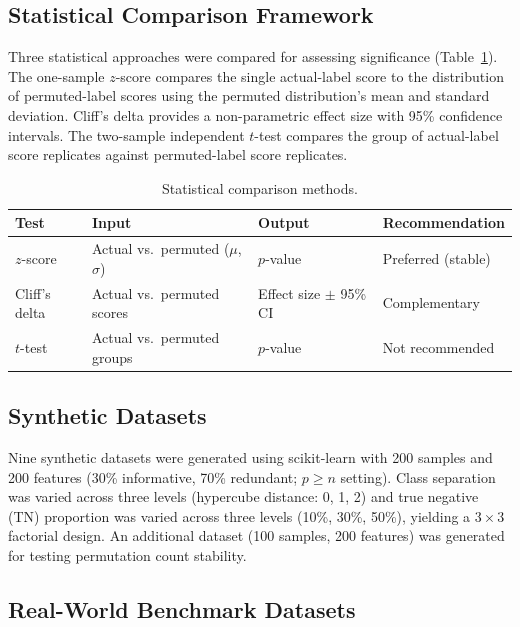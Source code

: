 \documentclass[12pt]{article}
\begin{document}
\subsection{Statistical Comparison Framework}

Three statistical approaches were compared for assessing significance (Table~\ref{tab:statistics}). The one-sample $z$-score compares the single actual-label score to the distribution of permuted-label scores using the permuted distribution's mean and standard deviation. Cliff's delta provides a non-parametric effect size with 95\% confidence intervals. The two-sample independent $t$-test compares the group of actual-label score replicates against permuted-label score replicates.

\begin{table}[ht]
\centering
\caption{Statistical comparison methods.}
\label{tab:statistics}
\begin{tabular}{llll}
\toprule
Test & Input & Output & Recommendation \\
\midrule
$z$-score & Actual vs.\ permuted ($\mu$, $\sigma$) & $p$-value & Preferred (stable) \\
Cliff's delta & Actual vs.\ permuted scores & Effect size $\pm$ 95\% CI & Complementary \\
$t$-test & Actual vs.\ permuted groups & $p$-value & Not recommended \\
\bottomrule
\end{tabular}
\end{table}

\subsection{Synthetic Datasets}

Nine synthetic datasets were generated using scikit-learn \citep{pedregosa2011scikit} with 200 samples and 200 features (30\% informative, 70\% redundant; $p \geq n$ setting). Class separation was varied across three levels (hypercube distance: 0, 1, 2) and true negative (TN) proportion was varied across three levels (10\%, 30\%, 50\%), yielding a $3 \times 3$ factorial design. An additional dataset (100 samples, 200 features) was generated for testing permutation count stability.

\subsection{Real-World Benchmark Datasets}
\end{document}
